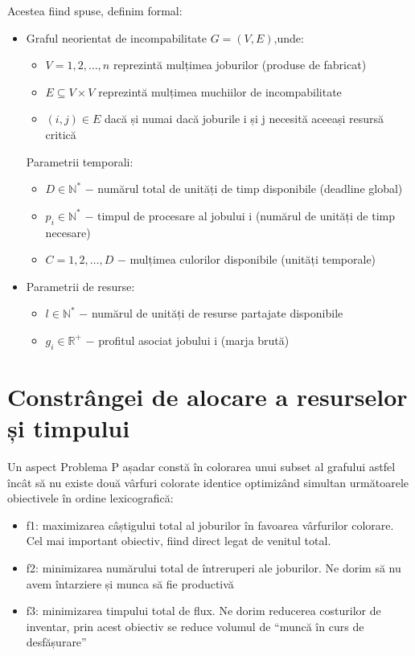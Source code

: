     Acestea fiind spuse, definim formal:
    \begin{itemize}
      \item Graful neorientat de incompabilitate $G=(V,E)$,unde:
      \begin{itemize}
        \item $V={1,2,\ldots,n}$  reprezintă mulțimea joburilor (produse de fabricat)
        \item $E \subseteq V \times V$ reprezintă mulțimea muchiilor de incompabilitate
        \item $(i,j) \in E$ dacă și numai dacă joburile i și j necesită aceeași resursă critică
      \end{itemize}
    Parametrii temporali:
      \begin{itemize}
        \item $D \in \mathbb{N}^*$ $-$ numărul total de unități de timp disponibile (deadline global)
        \item $p_i \in \mathbb{N}^*$ $-$ timpul de procesare al jobului i (numărul de unități de timp necesare)
        \item $C={1,2,\ldots,D}$ $-$ mulțimea culorilor disponibile (unități temporale)
      \end{itemize}
      \item Parametrii de resurse:
      \begin{itemize}
        \item $l \in \mathbb{N}^*$ $-$ numărul de unități de resurse partajate disponibile
        \item $g_i \in \mathbb{R}^+$ $-$ profitul asociat jobului i (marja brută)      
    \end{itemize}
  \end{itemize}
    
    





\section{Constrângei de alocare a resurselor și timpului}

    Un aspect Problema P așadar constă în colorarea unui subset al grafului astfel încât să nu existe două vârfuri colorate identice optimizând simultan următoarele  obiectivele în ordine lexicografică: 
    \begin{itemize}
    \item f1: maximizarea câștigului total al joburilor în favoarea vârfurilor colorare. Cel mai important obiectiv, fiind direct legat de venitul total. 
    \item f2: minimizarea numărului total de întreruperi ale joburilor. Ne dorim să nu avem întarziere și munca să fie productivă
    \item f3: minimizarea timpului total de flux. Ne dorim reducerea costurilor de inventar, prin acest obiectiv se reduce volumul de ``muncă în curs de desfășurare''
    \end{itemize}
      
